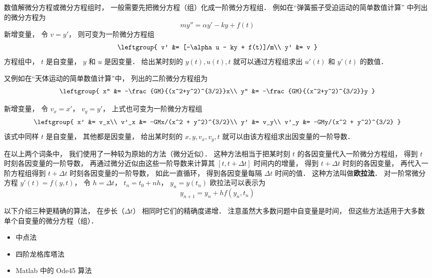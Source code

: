 

数值解微分方程或微分方程组时， 一般需要先把微分方程（组）化成一阶微分方程组． 例如在“弹簧振子受迫运动的简单数值计算” 中列出的微分方程为
\begin{equation}
m y'' = \alpha y' - ky + f(t)
\end{equation}
新增变量， 令 $v = y'$， 则可变为一阶微分方程组
\begin{equation}\leftgroup{
v' &= [-\alpha u - ky + f(t)]/m\\
y' &= v
}\end{equation}
方程组中， $t$ 是自变量， $y$ 和 $u$ 是因变量． 给出某时刻的 $y(t), u(t), t$ 就可以通过方程组求出 $u'(t)$ 和 $y'(t)$ 的数值．

又例如在“天体运动的简单数值计算”中， 列出的二阶微分方程组为
\begin{equation}
\leftgroup{
x'' &= -\frac{GM}{(x^2+y^2)^{3/2}}x\\
y'' &= -\frac{GM}{(x^2+y^2)^{3/2}}y
}\end{equation}

新增变量， 令 $v_x = x'$， $v_y = y'$， 上式也可变为一阶微分方程组
\begin{equation}\label{OdeNum_eq4}
\leftgroup{
x' &= v_x\\
v'_x &= -GMx/(x^2 + y^2)^{3/2}\\
y' &= v_y\\
v'_y &= -GMy/(x^2 + y^2)^{3/2}
}\end{equation}
该式中同样 $t$ 是自变量， 其他都是因变量， 给出某时刻的 $x, y, v_x, v_y, t$ 就可以由该方程组求出因变量的一阶导数．

在以上两个词条中， 我们使用了一种较为原始的方法（微分近似）． 这种方法相当于把某时刻 $t$ 的各因变量代入一阶微分方程组， 得到 $t$ 时刻各因变量的一阶导数， 再通过微分近似由这些一阶导数来计算其 $[t, t + \Delta t]$ 时间内的增量， 得到 $t +\Delta t$ 时刻的各因变量， 再代入一阶方程组得到 $t +\Delta t$ 时刻各因变量的一阶导数， 如此一直循环， 得到各因变量每隔 $\Delta t$ 时间的值． 这种方法叫做\textbf{欧拉法}． 对一阶常微分方程 $y'(t) = f(y, t)$， 令 $h = \Delta t$， $t_n = t_0 + nh$， $y_n = y(t_n)$ 欧拉法可以表示为
\begin{equation}\label{OdeNum_eq5}
y_{n+1} = y_n + h f(y_n, t_n)
\end{equation}

以下介绍三种更精确的算法， 在步长（$\Delta t$） 相同时它们的精确度递增． 注意虽然大多数问题中自变量是时间， 但这些方法适用于大多数单个自变量的微分方程（组）．

\begin{itemize}
\item 中点法
\item 四阶龙格库塔法
\item Matlab 中的 Ode45 算法
\end{itemize}












